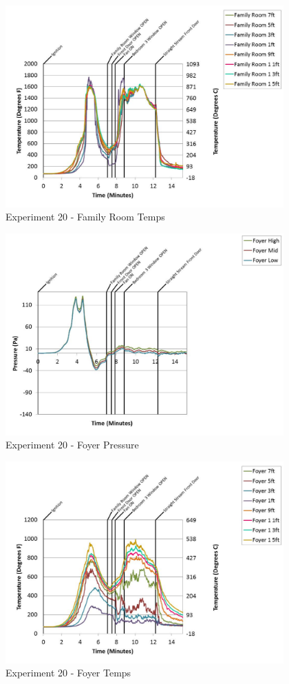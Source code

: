 \documentclass{article}
\begin{document}
\begin{appendices}
	\begin{figure}[h!]
		\centering
		\includegraphics[height=3.05in]{0_Images/Results_Charts/Exp_20_Charts/FamilyRoomTemps.pdf}
		\caption{Experiment 20 - Family Room Temps}
	\end{figure}
 
	\clearpage

	\begin{figure}[h!]
		\centering
		\includegraphics[height=3.05in]{0_Images/Results_Charts/Exp_20_Charts/FoyerPressure.pdf}
		\caption{Experiment 20 - Foyer Pressure}
	\end{figure}
 

	\begin{figure}[h!]
		\centering
		\includegraphics[height=3.05in]{0_Images/Results_Charts/Exp_20_Charts/FoyerTemps.pdf}
		\caption{Experiment 20 - Foyer Temps}
	\end{figure}
 

\end{appendices}
\end{document}
